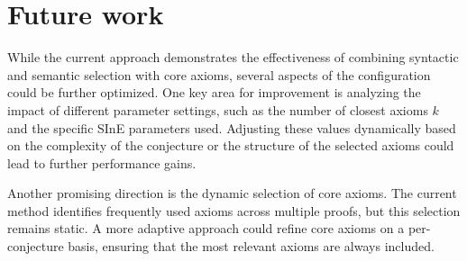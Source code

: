 \documentclass[english,version-2020-11]{uzl-thesis}
\begin{document}
\chapter{Future work}
\label{chapter-futerwork}

While the current approach demonstrates the effectiveness of combining syntactic and semantic selection with core axioms, several aspects of the configuration could be further optimized. One key area for improvement is analyzing the impact of different parameter settings, such as the number of closest axioms \( k \) and the specific SInE parameters used. Adjusting these values dynamically based on the complexity of the conjecture or the structure of the selected axioms could lead to further performance gains.

Another promising direction is the dynamic selection of core axioms. The current method identifies frequently used axioms across multiple proofs, but this selection remains static. A more adaptive approach could refine core axioms on a per-conjecture basis, ensuring that the most relevant axioms are always included.



%
\end{document}
